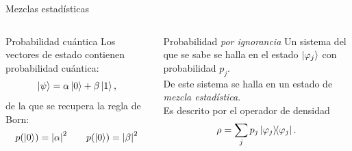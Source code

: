 \begin{frame}{Mezclas estadísticas}
    \begin{columns}
        \begin{column}{0.5\textwidth}
            \begin{block}{Probabilidad cuántica}
            Los vectores de estado contienen probabilidad cuántica:
            \begin{equation}
                \ket{\psi}=\alpha\ket{0}+\beta\ket{1},\nonumber
            \end{equation}
            \pause
            de la que se recupera la regla de Born:
            \begin{equation}
                p(\ket{0})=\abs{\alpha}^{2}\qquad p(\ket{0})=\abs{\beta}^{2}\nonumber
            \end{equation}
        \end{block}
        \end{column}
        \pause
        \begin{column}{0.5\textwidth}
            \begin{block}{Probabilidad \textit{por ignorancia}}
            Un sistema del que se sabe se halla en el estado $\ket{\varphi_{j}}$ con probabilidad $p_{j}$.\\
            \vspace{0.2cm}
            \pause
            De este sistema se halla en un estado de \textit{mezcla estadística}.\\
            \vspace{0.2cm}
            \pause
            Es descrito por el operador de densidad
            \begin{equation}
                \rho=\sum_{j}p_{j}\dyad{\varphi_{j}}.\nonumber
            \end{equation}
        \end{block}
        \end{column}
    \end{columns}
\end{frame}

